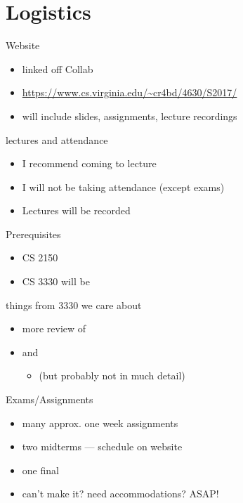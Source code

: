 \section{Logistics}

\begin{frame}{Website}
\begin{itemize}
    \item linked off Collab
    \item \url{https://www.cs.virginia.edu/~cr4bd/4630/S2017/}
    \item will include slides, assignments, lecture recordings
\end{itemize}
\end{frame}

\begin{frame}{lectures and attendance}
    \begin{itemize}
    \item I recommend coming to lecture
    \item I will not be taking attendance (except exams)
    \item Lectures will be recorded
    \end{itemize}
\end{frame}

\begin{frame}{Prerequisites}
\begin{itemize}
    \item {} CS 2150
    \item CS 3330 will be 
\end{itemize}
\end{frame}

\begin{frame}{things from 3330 we care about}
    \begin{itemize}
    \item more review of 
    \item {} and 
        \begin{itemize}
        \item (but probably not in much detail)
        \end{itemize}
    \end{itemize}
\end{frame}

\begin{frame}{Exams/Assignments}
\begin{itemize}
    \item many approx. one week assignments
    \vspace{.5cm}
    \item two midterms --- schedule on website
    \item one final
    \item can't make it? need accommodations?  ASAP!
\end{itemize}
\end{frame}

